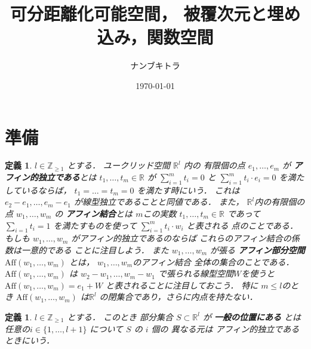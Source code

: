 \documentclass[leqno, a4paper, 12pt]{jsarticle}
\title{
可分距離化可能空間，
被覆次元と埋め込み，関数空間
}
\author{ナンブキトラ}
\date{\today}
\newtheorem{df}[thm]{定義}
\newcommand{\zz}{\mathbb{Z}}
\newcommand{\rr}{\mathbb{R}}
\newcommand{\yoemph}[1]{\textbf{#1}}
\newcommand{\yoaff}[1]{\mathrm{Aff}(#1)}
\numberwithin{equation}{section}
\begin{document}
\maketitle

\tableofcontents



\section{準備}

\begin{df}
$l\in \zz_{\ge 1}$
とする．
ユークリッド空間
$\rr^{l}$
内の
有限個の点
$e_{1}, \dots, e_{m}$
が
\yoemph{アフィン的独立である}とは
$t_{1}, \dots, t_{m}\in \rr$
が
$\sum_{i=1}^{m}t_{i}=0$
と
$\sum_{i=1}^{m}t_{i}\cdot e_{i}=0$
を満たしているならば，
$t_{1}=\dots =t_{m}=0$
を満たす時にいう．
これは
$e_{2}-e_{1}, \dots, e_{m}-e_{1}$
が線型独立であることと同値である．
また，
$\rr^{l}$内の有限個の点
$w_{1}, \dots, w_{m}$
の
\yoemph{アフィン結合}とは
$m$この実数
$t_{1}, \dots, t_{m}\in \rr$
であって
$\sum_{i=1}t_{i}=1$
を満たすものを使って
$\sum_{i=1}^{m}t_{i}\cdot w_{i}$
と表される
点のことである．
もしも
$w_{1}, \dots, w_{m}$
がアフィン的独立であるのならば
これらのアフィン結合の係数は一意的である
ことに注目しよう．
また
$w_{1}, \dots, w_{m}$
が張る
\yoemph{アフィン部分空間
$\yoaff{w_{1}, \dots, w_{m}}$}
とは，
$w_{1}, \dots, w_{m}$のアフィン結合
全体の集合のことである．
$\yoaff{w_{1}, \dots, w_{m}}$
は
$w_{2}-w_{1}, \dots, w_{m}-w_{1}$
で張られる線型空間$W$を使うと
$\yoaff{w_{1}, \dots, w_{m}}=e_{1}+W$
と表されることに注目しておこう．
特に
$m\le l$のとき
$\yoaff{w_{1}, \dots, w_{m}}$
は$\rr^{l}$
の閉集合であり，さらに内点を持たない．
\end{df}

\begin{df}
$l\in \zz_{\ge 1}$
とする．
このとき
部分集合
$S\subset \rr^{l}$
が
\yoemph{一般の位置にある}
とは
任意の$i\in \{1, \dots, l+1\}$
について
$S$
の
$i$
個の
異なる元は
アフィン的独立であるときにいう．
\end{df}
\end{document}
